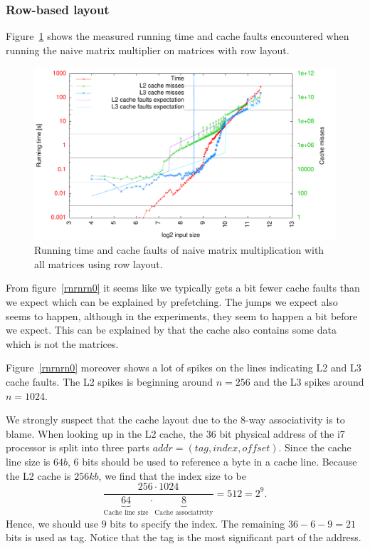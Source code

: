\subsubsection{Row-based layout}
Figure~\ref{fig:rnrnrn0} shows the measured running time and cache
faults encountered when running the naive matrix multiplier on
matrices with row layout.
\begin{figure}[h!]
  \centering
  \includegraphics[width=\textwidth]{plots/rowrow.pdf}
  \caption{Running time and cache faults of naive matrix
    multiplication with all matrices using row layout.}
  \label{fig:rnrnrn0}
\end{figure}

From figure~\ref{rnrnrn0} it seems like we typically gets a bit fewer
cache faults than we expect which can be explained by prefetching. The jumps we expect
also seems to happen, although in the experiments, they seem to happen
a bit before we expect. This can be explained by that the cache also
contains some data which is not the matrices.

Figure~\ref{rnrnrn0} moreover shows a lot of spikes on the lines
indicating L2 and L3 cache faults. The L2 spikes is beginning around
$n = 256$ and the L3 spikes around $n = 1024$.

We strongly suspect that the cache layout due to the 8-way
associativity is to blame. When looking up in the L2 cache, the 36 bit
physical address of the i7 processor is split into three parts $addr =
(tag,index,offset)$. Since the cache line size is $64b$, $6$ bits
should be used to reference a byte in a cache line. Because the L2
cache is $256kb$, we find that the index size to be
\[
  \frac{256 \cdot 1024}{\underbrace{64}_{\text{Cache line size}} \cdot \underbrace{8}_{\text{Cache associativity}}}
    = 512 = 2^9.
\]
Hence, we should use $9$ bits to specify the index. The remaining
$36-6-9=21$ bits is used as tag. Notice that the tag is the most
significant part of the address.

